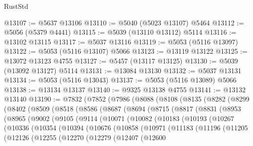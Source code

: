 \begin{lexlean}{RustStd}
\begin{coremodule}
@13107 := @5637 @13106
@13110 := @5040 (@5023 @13107) @5464
@13112 := @5056 (@5379 @4441)
@13115 := @5039 (@13110 @13112) @5114
@13116 := @13102 @13115
@13117 := @5037 @13116
@13119 := @5053 (@5116 @13097)
@13122 := @5053 (@5116 @13107) @5066
@13123 := @13119 @13122
@13125 := @13072 @13123 @4755
@13127 := @5457 (@13117 @13125)
@13130 := @5039 (@13092 @13127) @5114
@13131 := @13084 @13130
@13132 := @5037 @13131
@13134 := @5053 (@5116 @13043)
@13137 := @5053 (@5116 @13089) @5066
@13138 := @13134 @13137
@13140 := @9325 @13138 @4755
@13141 := @13132 @13140
@13190 := @7832
    (@7852
      (@7986
        (@8088
          (@8108
            (@8135
              (@8282
                (@8299
                  (@8402
                    (@8509
                      (@8518
                        (@8586
                          (@8687
                            (@8694
                              (@8715
                                (@8817
                                  (@8831
                                    (@8953
                                      (@8965
                                        (@9002
                                          (@9105
                                            (@9114
                                              (@10071
                                                (@10082
                                                  (@10183
                                                    (@10193
                                                      (@10267
                                                        (@10336
                                                          (@10354
                                                            (@10394
                                                              (@10676
                                                                (@10858
                                                                  (@10971
                                                                    (@11183
                                                                      (@11196
                                                                        (@11205
                                                                          (@12126
                                                                            (@12255
                                                                              (@12270
                                                                                (@12279
                                                                                  (@12407
                                                                                    (@12600

\end{coremodule}
\end{lexlean}
